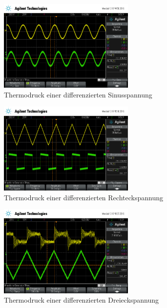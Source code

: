 \begin{figure}
	\centering
	\includegraphics[width=0.6\textwidth]{img/scope_4_diff_sin.png}
	\caption{Thermodruck einer differenzierten Sinusspannung}
	\label{fig:diffsin}
\end{figure}

\begin{figure}
	\centering
	\includegraphics[width=0.6\textwidth]{img/scope_5_diff_rechteck.png}
	\caption{Thermodruck einer differenzierten Rechteckspannung}
	\label{fig:diffrechteck}
\end{figure}

\begin{figure}
	\centering
	\includegraphics[width=0.6\textwidth]{img/scope_6_diff_dreieck.png}
	\caption{Thermodruck einer differenzierten Dreieckspannung}
	\label{fig:diffdreieck}
\end{figure}

